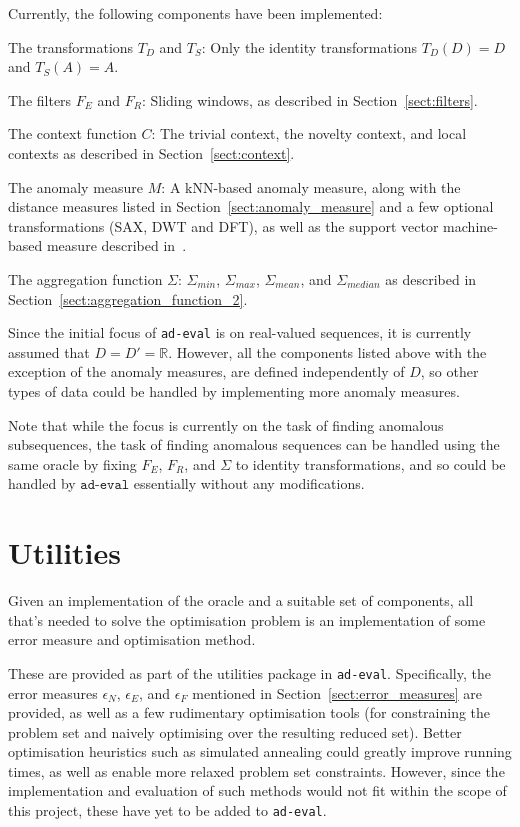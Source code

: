 Currently, the following components have been implemented:
\begin{description}
    \item{The transformations $T_D$ and $T_S$:} Only the identity transformations $T_D(D) = D$ and $T_S(A) = A$.
    \item{The filters $F_E$ and $F_R$:} Sliding windows, as described in Section~\ref{sect:filters}.
    \item{The context function $C$:} The trivial context, the novelty context, and local contexts as described in Section~\ref{sect:context}.
    \item{The anomaly measure $M$:} A kNN-based anomaly measure, along with the distance measures listed in Section~\ref{sect:anomaly_measure} and a few optional transformations (SAX, DWT and DFT), as well as the support vector machine-based measure described in~\cite{chandola3}.
    \item{The aggregation function $\Sigma$:} $\Sigma_{min}$, $\Sigma_{max}$, $\Sigma_{mean}$, and $\Sigma_{median}$ as described in Section~\ref{sect:aggregation_function_2}.
\end{description}

Since the initial focus of \texttt{ad-eval} is on real-valued sequences, it is currently assumed that $D = D' = \mathbb{R}$. However, all the components listed above with the exception of the anomaly measures, are defined independently of $D$, so other types of data could be handled by implementing more anomaly measures.

Note that while the focus is currently on the task of finding anomalous subsequences, the task of finding anomalous sequences can be handled using the same oracle by fixing $F_E$, $F_R$, and $\Sigma$ to identity transformations, and so could be handled by $\texttt{ad-eval}$ essentially without any modifications.

\section{Utilities}

Given an implementation of the oracle and a suitable set of components, all that's needed to solve the optimisation problem is an implementation of some error measure and optimisation method.

These are provided as part of the utilities package in \texttt{ad-eval}. Specifically, the error measures $\epsilon_N$, $\epsilon_E$, and $\epsilon_F$ mentioned in Section~\ref{sect:error_measures} are provided, as well as a few rudimentary optimisation tools (for constraining the problem set and naively optimising over the resulting reduced set). Better optimisation heuristics such as simulated annealing could greatly improve running times, as well as enable more relaxed problem set constraints. However, since the implementation and evaluation of such methods would not fit within the scope of this project, these have yet to be added to \texttt{ad-eval}.

